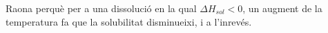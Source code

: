 \begin{exr}
Raona perquè per a una dissolució en la qual $\Delta H_{sol} <0$, un augment de la temperatura fa que la solubilitat disminueixi, i a l'inrevés.
\end{exr}